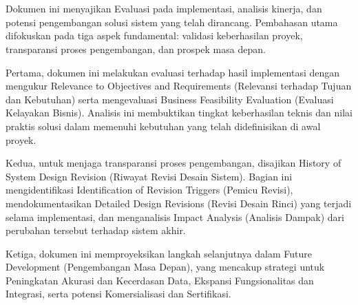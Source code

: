 \documentclass{elsinta}
\begin{document}
\coverpage
\newpage


\newpage


\clearpage
{}
\setcounter{page}{1} 
\pagestyle{myfooter} %


\tableofcontents
\newpage
\section*{\docsumary}
Dokumen ini menyajikan Evaluasi pada  implementasi, analisis kinerja, dan potensi pengembangan solusi sistem yang telah dirancang. Pembahasan utama difokuskan pada tiga aspek fundamental: validasi keberhasilan proyek, transparansi proses pengembangan, dan prospek masa depan.

Pertama, dokumen ini melakukan evaluasi terhadap hasil implementasi dengan mengukur Relevance to Objectives and Requirements (Relevansi terhadap Tujuan dan Kebutuhan) serta mengevaluasi Business Feasibility Evaluation (Evaluasi Kelayakan Bisnis). Analisis ini membuktikan tingkat keberhasilan teknis dan nilai praktis solusi dalam memenuhi kebutuhan yang telah didefinisikan di awal proyek.

Kedua, untuk menjaga transparansi proses pengembangan, disajikan History of System Design Revision (Riwayat Revisi Desain Sistem). Bagian ini mengidentifikasi Identification of Revision Triggers (Pemicu Revisi), mendokumentasikan Detailed Design Revisions (Revisi Desain Rinci) yang terjadi selama implementasi, dan menganalisis Impact Analysis (Analisis Dampak) dari perubahan tersebut terhadap sistem akhir.

Ketiga, dokumen ini memproyeksikan langkah selanjutnya dalam Future Development (Pengembangan Masa Depan), yang mencakup strategi untuk Peningkatan Akurasi dan Kecerdasan Data, Ekspansi Fungsionalitas dan Integrasi, serta potensi Komersialisasi dan Sertifikasi.
\end{document}
